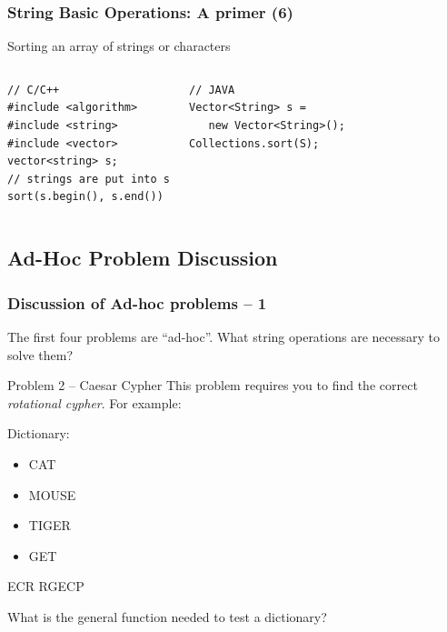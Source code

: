 \documentclass{beamer}
\begin{document}
\begin{frame}[fragile]
  \frametitle{String Basic Operations: A primer (6)}
  {\smaller
    \begin{block}{Sorting an array of strings or characters}
      \begin{columns}[T]
\begin{verbatim}
// C/C++
#include <algorithm>
#include <string>
#include <vector>
vector<string> s;
// strings are put into s
sort(s.begin(), s.end())
\end{verbatim}
\begin{verbatim}
// JAVA
Vector<String> s = 
   new Vector<String>();
Collections.sort(S);

\end{verbatim}
      \end{columns}
    \end{block}
  }
\end{frame}

\subsection{Ad-Hoc Problem Discussion}
\begin{frame}
  \frametitle{Discussion of Ad-hoc problems -- 1}

  {\smaller
    \begin{block}{}
      The first four problems are ``ad-hoc''. What string operations
      are necessary to solve them?
    \end{block}

    \begin{exampleblock}{Problem 2 -- Caesar Cypher}
      This problem requires you to find the correct \emph{rotational
        cypher}. For example:

      \medskip
      
      Dictionary:
      \begin{itemize}
      \item CAT
      \item MOUSE
      \item TIGER
      \item GET
      \end{itemize}

      \medskip
      ECR RGECP      
    \end{exampleblock}

    What is the general function needed to test a dictionary?    
  }
\end{frame}
\end{document}
